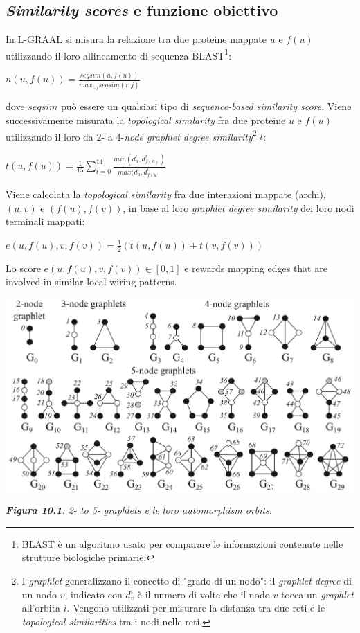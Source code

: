 \documentclass[11pt]{article}
\begin{document}
\subsection{\textit{Similarity scores} e funzione obiettivo}
In L-GRAAL si misura la relazione tra due proteine mappate $u$ e $f(u)$ utilizzando il loro allineamento di sequenza BLAST\footnote{BLAST è un algoritmo usato per comparare le informazioni contenute nelle strutture biologiche primarie.}:
\begin{center}
$n(u,f(u)) = \displaystyle{\frac{seqsim(u,f(u))}{max_{i,j}seqsim(i,j)}}$
\end{center}
dove $seqsim$ può essere un qualsiasi tipo di \textit{sequence-based similarity score}. Viene successivamente misurata la \textit{topological similarity} fra due proteine $u$ e $f(u)$ utilizzando il loro da 2- a 4-\textit{node graphlet degree similarity}\footnote{I \textit{graphlet} generalizzano il concetto di "grado di un nodo": il \textit{graphlet degree} di un nodo $v$, indicato con $d^i_v$ è il numero di volte che il nodo $v$ tocca un \textit{graphlet} all'orbita $i$. Vengono utilizzati per misurare la distanza tra due reti e le \textit{topological similarities} tra i nodi nelle reti.} $t$:
\begin{center}
$t(u,f(u)) = \frac{1}{15}\displaystyle{\sum \limits_{i=0}^{14}\frac{min(d_u^i,d_{f(u)}^i)}{max(d_u^i,d_{f(u)}^i}}$
\end{center}
Viene calcolata la \textit{topological similarity} fra due interazioni mappate (archi), $(u,v)$ e $(f(u),f(v))$, in base al loro \textit{graphlet degree similarity} dei loro nodi terminali mappati:

\begin{center}
$e(u,f(u),v,f(v)) = \displaystyle{\frac{1}{2}(t(u,f(u))+t(v,f(v)))}$
\end{center}
Lo score $e(u,f(u),v,f(v)) \in [0,1]$ e rewards mapping edges that are involved in similar local wiring patterns.

\begin{center}
\includegraphics[scale=0.33]{graal1}

\begin{small}\textit{\textbf{Figura 10.1}: 2- to 5- graphlets e le loro automorphism orbits}.\end{small}
\end{center}
\end{document}
